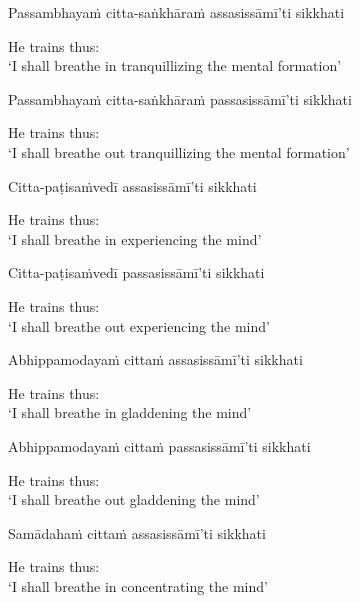 Passambhayaṁ citta-saṅkhāraṁ assasissāmī'ti sikkhati

\begin{english}
  He trains thus:\\
  `I shall breathe in tranquillizing the mental formation'\makeatletter\hyperlink{endnote70-appendix}\makeatother
\end{english}

Passambhayaṁ citta-saṅkhāraṁ passasissāmī'ti sikkhati

\begin{english}
  He trains thus:\\
  `I shall breathe out tranquillizing the mental formation'
\end{english}

Citta-paṭisaṁvedī assasissāmī'ti sikkhati

\begin{english}
  He trains thus:\\
  `I shall breathe in experiencing the mind'
\end{english}

Citta-paṭisaṁvedī passasissāmī'ti sikkhati

\begin{english}
  He trains thus:\\
  `I shall breathe out experiencing the mind'
\end{english}

Abhippamodayaṁ cittaṁ assasissāmī'ti sikkhati

\begin{english}
  He trains thus:\\
  `I shall breathe in gladdening the mind'
\end{english}

Abhippamodayaṁ cittaṁ passasissāmī'ti sikkhati

\begin{english}
  He trains thus:\\
  `I shall breathe out gladdening the mind'
\end{english}

Samādahaṁ cittaṁ assasissāmī'ti sikkhati

\begin{english}
  He trains thus:\\
  `I shall breathe in concentrating the mind'
\end{english}

